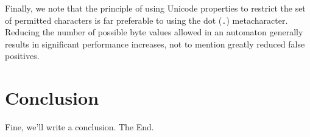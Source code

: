 \documentclass[5p,final,number,sort&compress]{elsarticle}
\newcommand{\re}[1]{\texttt{#1}}
\begin{document}
Finally, we note that the principle of using Unicode properties to restrict the set of permitted characters is far preferable to using the dot (\re{.}) metacharacter. Reducing the number of possible byte values allowed in an automaton generally results in significant performance increases, not to mention greatly reduced false positives.

\section{Conclusion}

Fine, we'll write a conclusion. The End.



\end{document}
